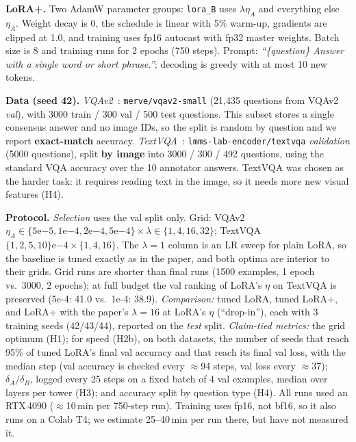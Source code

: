\documentclass[10pt,a4paper]{article}
\newcommand{\etaA}{\eta_A}
\begin{document}
\textbf{LoRA+.} Two AdamW parameter groups: \texttt{lora\_B} uses $\lambda\etaA$ and everything else $\etaA$.
Weight decay is 0, the schedule is linear with 5\% warm-up, gradients are clipped at 1.0, and training uses fp16
autocast with fp32 master weights. Batch size is 8 and training runs for 2 epochs (750 steps). Prompt:
\emph{``\{question\} Answer with a single word or short phrase.''}; decoding is greedy with at most 10 new tokens.

\textbf{Data (seed 42).} \emph{VQAv2}~\cite{vqav2}: \texttt{merve/vqav2-small} (21{,}435 questions from VQAv2
\emph{val}), with 3000 train / 300 val / 500 test questions. This subset stores a single consensus answer and no
image IDs, so the split is random by question and we report \textbf{exact-match} accuracy. \emph{TextVQA}~\cite{textvqa}:
\texttt{lmms-lab-encoder/textvqa} \emph{validation} (5000 questions), split \textbf{by image} into 3000 / 300 / 492
questions, using the standard VQA accuracy over the 10 annotator answers. TextVQA was chosen as the harder task: it
requires reading text in the image, so it needs more new visual features (H4).

\textbf{Protocol.} \emph{Selection} uses the val split only. Grid: VQAv2 $\etaA\in\{5\mathrm{e}{-5}, 1\mathrm{e}{-4},
2\mathrm{e}{-4}, 5\mathrm{e}{-4}\} \times \lambda\in\{1,4,16,32\}$; TextVQA $\{1,2,5,10\}\mathrm{e}{-4}\times\{1,4,16\}$.
The $\lambda=1$ column is an LR sweep for plain LoRA, so the baseline is tuned exactly as in the paper, and both
optima are interior to their grids. Grid runs are shorter than final runs (1500 examples, 1 epoch vs.\ 3000, 2
epochs); at full budget the val ranking of LoRA's $\eta$ on TextVQA is preserved (5e-4: 41.0 vs.\ 1e-4: 38.9).
\emph{Comparison:} tuned LoRA, tuned LoRA+, and LoRA+ with the paper's $\lambda=16$ at LoRA's $\eta$ (``drop-in''),
each with 3 training seeds (42/43/44), reported on the \emph{test} split. \emph{Claim-tied metrics:} the grid
optimum (H1); for speed (H2b), on both datasets, the number of seeds that reach 95\% of tuned LoRA's final val
accuracy and that reach its final val loss, with the median step (val accuracy is checked every $\approx$94
steps, val loss every $\approx$37); $\delta_A/\delta_B$, logged every 25 steps on a fixed batch of 4 val examples,
median over layers per tower (H3); and accuracy split by question type (H4). All runs used an RTX\,4090
($\approx$10\,min per 750-step run). Training uses fp16, not bf16, so it also runs on a Colab T4; we estimate
25--40\,min per run there, but have not measured it.
\end{document}
